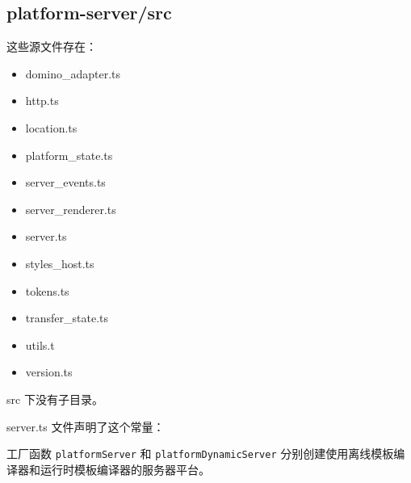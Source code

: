 \subsection{platform-server/src}


这些源文件存在：

\begin{itemize}
  \item domino\_adapter.ts
  \item http.ts
  \item location.ts
  \item platform\_state.ts
  \item server\_events.ts
  \item server\_renderer.ts
  \item server.ts
  \item styles\_host.ts
  \item tokens.ts
  \item transfer\_state.ts
  \item utils.t
  \item version.ts
\end{itemize}


src 下没有子目录。


server.ts 文件声明了这个常量：




工厂函数 \texttt{platformServer} 和 \texttt{platformDynamicServer}
分别创建使用离线模板编译器和运行时模板编译器的服务器平台。



